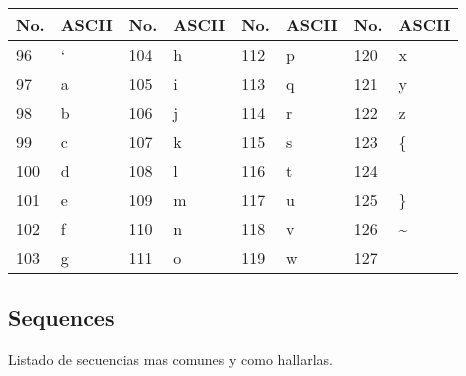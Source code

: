 \documentclass[10pt,landscape,twocolumn,letterpaper,twosided]{article}
\begin{document}
			\begin{tabular}{|l|l|l|l|l|l|l|l|}
				\hline \textbf{No.} & \textbf{ASCII} & \textbf{No.} & \textbf{ASCII}  &
					\textbf{No.} & \textbf{ASCII} & \textbf{No.} & \textbf{ASCII} \\ \hline
				96 & ` & 104 & h & 112 & p & 120 & x \\ \hline
				97 & a & 105 & i & 113 & q & 121 & y \\ \hline
				98 & b & 106 & j & 114 & r & 122 & z \\ \hline
				99 & c & 107 & k & 115 & s & 123 & \{ \\ \hline
				100 & d & 108 & l & 116 & t & 124 & \textbar \\ \hline
				101 & e & 109 & m & 117 & u & 125 & \} \\ \hline
				102 & f & 110 & n & 118 & v & 126 & \textasciitilde \\ \hline
				103 & g &  111 & o & 119 & w & 127 &  \\ \hline
			\end{tabular}
			
			\subsection{Sequences}
				Listado de secuencias mas comunes y como hallarlas.
\end{document}
